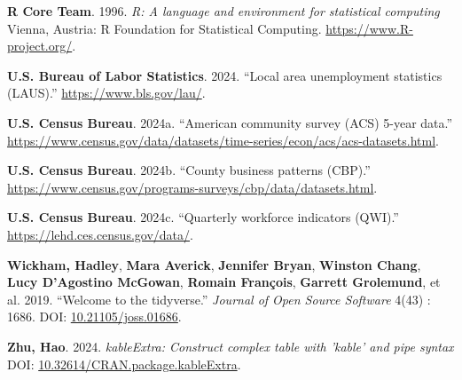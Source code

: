 \documentclass[
]{article}
\newlength{\cslhangindent}
\newenvironment{CSLReferences}[2] %
 {\begin{list}{}{%
  \setlength{\itemindent}{0pt}
  \setlength{\leftmargin}{0pt}
  \setlength{\parsep}{0pt}
  \ifodd #1
   \setlength{\leftmargin}{\cslhangindent}
   \setlength{\itemindent}{-1\cslhangindent}
  \fi
  \setlength{\itemsep}{#2\baselineskip}}}
 {\end{list}}
\begin{document}
\begin{CSLReferences}{1}{0}
\textbf{R Core Team}. 1996. \emph{R: A language and environment for
statistical computing} Vienna, Austria: R Foundation for Statistical
Computing. \url{https://www.R-project.org/}.

\textbf{U.S. Bureau of Labor Statistics}. 2024. {``Local area
unemployment statistics ({LAUS}).''} \url{https://www.bls.gov/lau/}.

\textbf{U.S. Census Bureau}. 2024a. {``American community survey ({ACS})
5-year data.''}
\url{https://www.census.gov/data/datasets/time-series/econ/acs/acs-datasets.html}.

\textbf{U.S. Census Bureau}. 2024b. {``County business patterns
({CBP}).''}
\url{https://www.census.gov/programs-surveys/cbp/data/datasets.html}.

\textbf{U.S. Census Bureau}. 2024c. {``Quarterly workforce indicators
({QWI}).''} \url{https://lehd.ces.census.gov/data/}.

\textbf{Wickham, Hadley}, \textbf{Mara Averick}, \textbf{Jennifer
Bryan}, \textbf{Winston Chang}, \textbf{Lucy D'Agostino McGowan},
\textbf{Romain François}, \textbf{Garrett Grolemund}, et al. 2019.
{``Welcome to the {tidyverse}.''} \emph{Journal of Open Source Software}
4(43) : 1686. DOI:
\href{https://doi.org/10.21105/joss.01686}{10.21105/joss.01686}.

\textbf{Zhu, Hao}. 2024. \emph{kableExtra: Construct complex table with
'kable' and pipe syntax} DOI:
\href{https://doi.org/10.32614/CRAN.package.kableExtra}{10.32614/CRAN.package.kableExtra}.

\end{CSLReferences}
\end{document}
